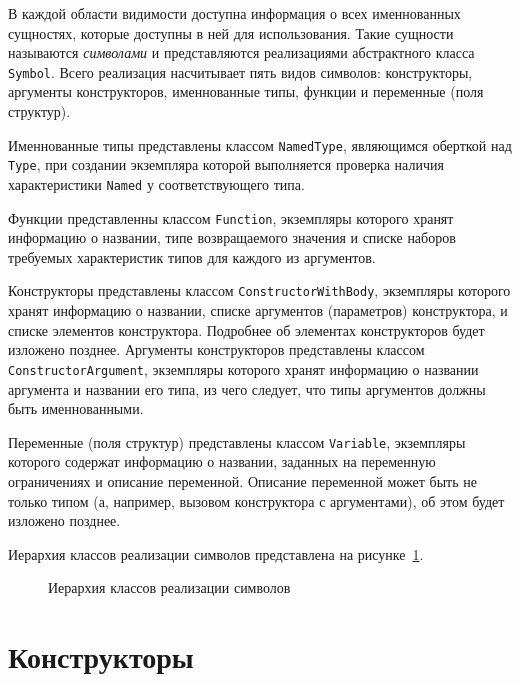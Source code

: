 \documentclass[times,specification,annotation]{style/itmo-student-thesis/itmo-student-thesis}
\begin{document}
В каждой области видимости доступна информация о всех именнованных сущностях, которые доступны в ней для использования. Такие сущности называются \textit{символами} и представляются реализациями абстрактного класса \texttt{Symbol}. Всего реализация насчитывает пять видов символов: конструкторы, аргументы конструкторов, именнованные типы, функции и переменные (поля структур). 

Именнованные типы представлены классом \texttt{NamedType}, являющимся оберткой над \texttt{Type}, при создании экземпляра которой выполняется проверка наличия характеристики \texttt{Named} у соответствующего типа.

Функции представленны классом \texttt{Function}, экземпляры которого хранят информацию о названии, типе возвращаемого значения и списке наборов требуемых характеристик типов для каждого из аргументов.

Конструкторы представлены классом \texttt{ConstructorWithBody}, экземпляры которого хранят информацию о названии, списке аргументов (параметров) конструктора, и списке элементов конструктора. Подробнее об элементах конструкторов будет изложено позднее. Аргументы конструкторов представлены классом \texttt{ConstructorArgument}, экземпляры которого хранят информацию о названии аргумента и названии его типа, из чего следует, что типы аргументов должны быть именнованными.

Переменные (поля структур) представлены классом \texttt{Variable}, экземпляры которого содержат информацию о названии, заданных на переменную ограничениях и описание переменной. Описание переменной может быть не только типом (а, например, вызовом конструктора с аргументами), об этом будет изложено позднее.

Иерархия классов реализации символов представлена на рисунке~\ref{symbol-classes-hierarchy}.

\begin{figure}[!h]
\caption{Иерархия классов реализации символов}\label{symbol-classes-hierarchy}
\centering
{}
\end{figure}

\section{Конструкторы}
\end{document}
